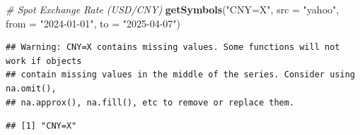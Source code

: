 \documentclass[
]{article}
\newenvironment{Shaded}{\begin{snugshade}}{\end{snugshade}}
\newcommand{\AttributeTok}[1]{\textcolor[rgb]{0.13,0.29,0.53}{#1}}
\newcommand{\CommentTok}[1]{\textcolor[rgb]{0.56,0.35,0.01}{\textit{#1}}}
\newcommand{\FunctionTok}[1]{\textcolor[rgb]{0.13,0.29,0.53}{\textbf{#1}}}
\newcommand{\NormalTok}[1]{#1}
\newcommand{\StringTok}[1]{\textcolor[rgb]{0.31,0.60,0.02}{#1}}
\begin{document}
\begin{Shaded}
\begin{Highlighting}[]
\CommentTok{\# Spot Exchange Rate (USD/CNY)}
\FunctionTok{getSymbols}\NormalTok{(}\StringTok{"CNY=X"}\NormalTok{, }\AttributeTok{src =} \StringTok{"yahoo"}\NormalTok{, }\AttributeTok{from =} \StringTok{"2024{-}01{-}01"}\NormalTok{, }\AttributeTok{to =} \StringTok{"2025{-}04{-}07"}\NormalTok{)}
\end{Highlighting}
\end{Shaded}

\begin{verbatim}
## Warning: CNY=X contains missing values. Some functions will not work if objects
## contain missing values in the middle of the series. Consider using na.omit(),
## na.approx(), na.fill(), etc to remove or replace them.
\end{verbatim}

\begin{verbatim}
## [1] "CNY=X"
\end{verbatim}
\end{document}
